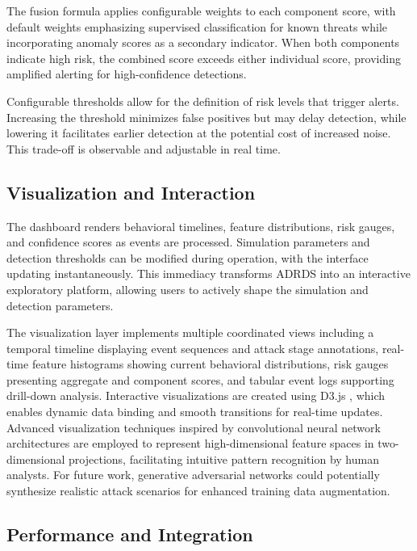 The fusion formula applies configurable weights to each component score, with default weights emphasizing supervised classification for known threats while incorporating anomaly scores as a secondary indicator. When both components indicate high risk, the combined score exceeds either individual score, providing amplified alerting for high-confidence detections.

Configurable thresholds allow for the definition of risk levels that trigger alerts. Increasing the threshold minimizes false positives but may delay detection, while lowering it facilitates earlier detection at the potential cost of increased noise. This trade-off is observable and adjustable in real time.

\subsection{Visualization and Interaction}

The dashboard renders behavioral timelines, feature distributions, risk gauges, and confidence scores as events are processed. Simulation parameters and detection thresholds can be modified during operation, with the interface updating instantaneously. This immediacy transforms ADRDS into an interactive exploratory platform, allowing users to actively shape the simulation and detection parameters.

The visualization layer implements multiple coordinated views including a temporal timeline displaying event sequences and attack stage annotations, real-time feature histograms showing current behavioral distributions, risk gauges presenting aggregate and component scores, and tabular event logs supporting drill-down analysis. Interactive visualizations are created using D3.js \cite{bostock2011d3}, which enables dynamic data binding and smooth transitions for real-time updates. Advanced visualization techniques inspired by convolutional neural network architectures \cite{krizhevsky2012imagenet} are employed to represent high-dimensional feature spaces in two-dimensional projections, facilitating intuitive pattern recognition by human analysts. For future work, generative adversarial networks \cite{goodfellow2014generative} could potentially synthesize realistic attack scenarios for enhanced training data augmentation.

\subsection{Performance and Integration}


